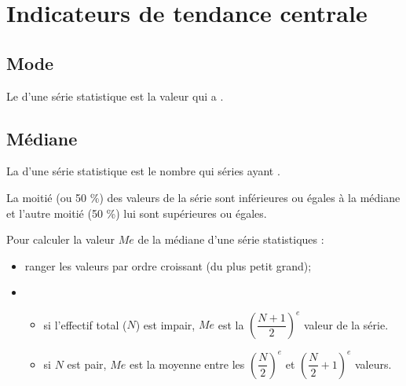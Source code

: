 \documentclass[12pt,a4paper]{article}
\date{}
\title{}
\begin{document}
{}

\section{Indicateurs de tendance centrale}


\subsection{Mode}
\begin{mydef}
	Le  d'une série statistique est la valeur qui a .
\end{mydef}





\subsection{Médiane}

\begin{mydef}
	La  d'une série statistique est le nombre qui  séries ayant .
	
	La moitié (ou 50 \%)  des valeurs de la série sont inférieures ou égales à la médiane et l'autre moitié (50 \%) lui sont supérieures ou égales.
\end{mydef}

\begin{mymeth}
	Pour calculer la valeur $Me$ de la médiane d'une série statistiques :
	\begin{itemize}
		\item ranger les valeurs par ordre croissant (du plus petit grand);
		\item \begin{itemize}
			\item si l'effectif total ($N$) est impair, $Me$ est la $ \left( \dfrac{N+1}{2}\right)  ^e$ valeur de la série.
			\item si $N$ est pair, $Me$ est la moyenne entre les $\left(\dfrac{N}{2}\right)^e$ et  $\left(\dfrac{N}{2} + 1\right)^e$ valeurs.
			
		\end{itemize}
	\end{itemize}
\end{mymeth}
\end{document}
